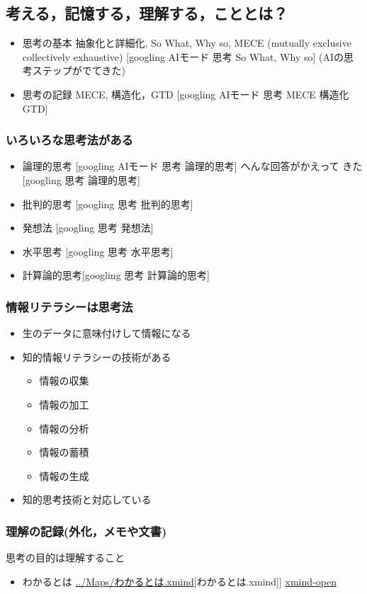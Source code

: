 \documentclass[dvipdfmx,11pat]{jarticle}
\begin{document}
\subsection{考える，記憶する，理解する，こととは？}
\label{sec:orgc1ac6cc}

\begin{itemize}
\item 思考の基本 抽象化と詳細化, So What, Why so, MECE (mutually
exclusive collectively exhaustive)
{[}googling AIモード 思考 So What, Why so] (AIの思考ステップがでてきた)
\item 思考の記録 MECE, 構造化，GTD
{[}googling AIモード 思考 MECE 構造化 GTD]
\end{itemize}
\subsubsection{いろいろな思考法がある}
\label{sec:org20ca929}
\begin{itemize}
\item 論理的思考  [googling AIモード 思考 論理的思考] へんな回答がかえって
きた
{[}googling 思考 論理的思考]
\item 批判的思考 [googling 思考 批判的思考]
\item 発想法 [googling 思考 発想法]
\item 水平思考 [googling 思考 水平思考]
\item 計算論的思考[googling 思考 計算論的思考]
\end{itemize}
\subsubsection{情報リテラシーは思考法}
\label{sec:org32e2ecb}
\begin{itemize}
\item 生のデータに意味付けして情報になる
\item 知的情報リテラシーの技術がある
\begin{itemize}
\item 情報の収集
\item 情報の加工
\item 情報の分析
\item 情報の蓄積
\item 情報の生成
\end{itemize}
\item 知的思考技術と対応している
\end{itemize}
\subsubsection{理解の記録(外化，メモや文書)}
\label{sec:org3dc8d99}
思考の目的は理解すること
\begin{itemize}
\item わかるとは \url{../Maps/わかるとは.xmind}{[}わかるとは.xmind]]  \href{shell:xmind ../Maps/わかるとは.xmind}{xmind-open}
\end{itemize}
\end{document}
